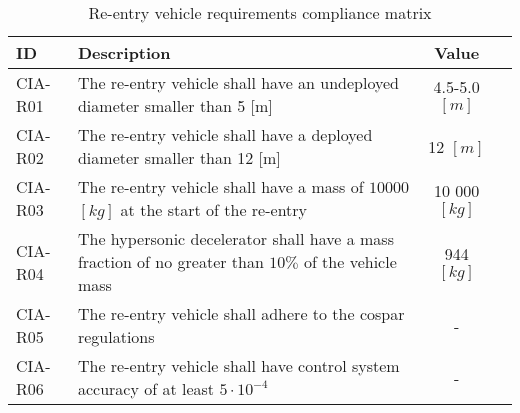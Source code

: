 \begin{table}[H]
\centering
	\caption{Re-entry vehicle requirements compliance matrix} 
	\label{tab:compv}
	\begin{tabular}{|p{}|p{}|c|c|}
	    \hline
	    ID          & Description   & Value &                                                                                           \\ \hline \hline
	CIA-R01 & The re-entry vehicle shall have an undeployed diameter smaller than 5 [m]                   & 4.5-5.0 $[m]$  & \cmark     				            \\ \hline
	CIA-R02 & The re-entry vehicle shall have a deployed diameter smaller than 12 [m]                     & 12 $[m]$ &  \cmark 				            \\ \hline	
	CIA-R03 & The re-entry vehicle shall have a mass of $10 000$ $[kg]$ at the start of the re-entry           & 10 000 $[kg]$ &  \cmark          				            \\ \hline
	CIA-R04 & The hypersonic decelerator shall have a mass fraction of no greater than $10\%$ of the vehicle mass	& 944 $[kg]$ & \cmark \\ \hline 
	CIA-R05 &  The re-entry vehicle shall adhere to the \gls{cospar} regulations  & - & \cmark \\ \hline
	CIA-R06 &  The re-entry vehicle shall have control system accuracy of at least $5\cdot 10^{-4}$ & - & \cmark \\ \hline
    \end{tabular}
\end{table}


